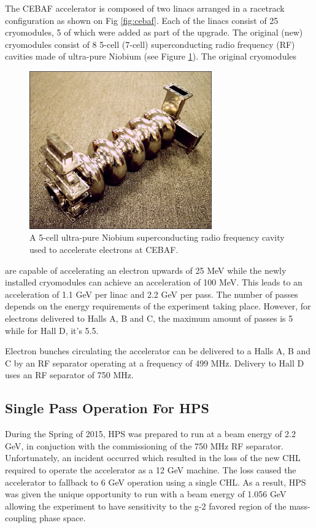 The CEBAF accelerator is composed of two linacs arranged in a racetrack
configuration as shown on Fig \ref{fig:cebaf}. Each of the linacs consist
of 25 cryomodules, 5 of which were added as part of the upgrade.  The original
(new) cryomodules consist of 8 5-cell (7-cell) superconducting radio frequency
(RF) cavities made of ultra-pure Niobium (see Figure \ref{fig:cebaf_cavity}).  
The original cryomodules
\begin{figure}[h]
    \centering
    \includegraphics[width=0.7\textwidth]{images/cebaf_cavity.jpg}
    \caption{A 5-cell ultra-pure Niobium superconducting radio frequency cavity
             used to accelerate electrons at CEBAF.}
    \label{fig:cebaf_cavity}
\end{figure}
are capable of accelerating an electron upwards of 25 MeV while the newly installed
cryomodules can achieve an acceleration of 100 MeV.  This leads to an acceleration
of 1.1 GeV per linac and 2.2 GeV per pass. The 
number of passes depends on the energy requirements of the experiment taking place.
However, for electrons delivered to Halls A, B and C, the maximum amount of passes
is 5 while for Hall D, it's 5.5.

Electron bunches circulating the accelerator can be delivered to a Halls A, B
and C by an RF separator operating at a frequency of 499 MHz.  Delivery to Hall
D uses an RF separator of 750 MHz.

\subsection{Single Pass Operation For HPS}

During the Spring of 2015, HPS was prepared to run at a beam energy of 2.2 GeV,
in conjuction with the commissioning of the 750 MHz RF separator.
Unfortunately, an incident occurred which resulted in the loss of the new CHL
required to operate the accelerator as a 12 GeV machine.
The loss caused the accelerator to 
fallback to 6 GeV operation using a single CHL.  As a result, HPS was given
the unique opportunity to run with a beam energy of 1.056 GeV allowing the
experiment to have sensitivity to the g-2 favored region of the mass-coupling
phase space.  

